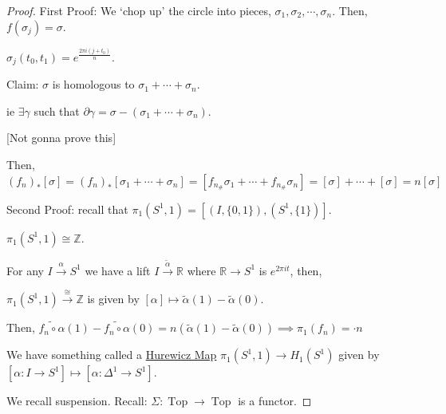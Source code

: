 \documentclass{article}
\theoremstyle{definition}
\begin{document}
    \begin{proof}
        First Proof: We `chop up' the circle into pieces, \(\sigma_1, \sigma_2, \cdots , \sigma_n\). Then, \(f(\sigma_j) = \sigma\). 
        
        \(\sigma_j(t_0,t_1) = e^{\frac{2\pi i(j+t_0)}{n}}\).

        Claim: \(\sigma\) is homologous to \(\sigma_1 + \cdots + \sigma_n\).
        
        ie \(\exists \gamma\) such that \(\partial \gamma = \sigma - (\sigma_1 + \cdots + \sigma_n)\).

        [Not gonna prove this]

        Then, \((f_n)_{\ast} [\sigma] = (f_n)_{\ast} [\sigma_1 + \cdots + \sigma_n] = [f_{n_\#} \sigma_1 + \cdots + f_{n_\#} \sigma_n] = [\sigma] + \cdots + [\sigma] = n[\sigma]\)

        Second Proof: recall that \(\pi_1(S^1,1) = [(I,\{ 0,1 \}), (S^1,\{ 1 \})]\).
        
        \(\pi_1(S^1,1) \cong \mathbb{Z}\).

        For any \(I \xrightarrow{\alpha} S^1\) we have a lift \(I \xrightarrow{\widetilde{\alpha}} \mathbb{R}\) where \(\mathbb{R} \to S^1\) is \(e^{2 \pi i t}\), then,
        
        \(\pi_1(S^1,1) \xrightarrow{\cong} \mathbb{Z}\) is given by \([\alpha] \mapsto \widetilde{\alpha}(1) - \widetilde{\alpha}(0)\).

        Then, \(\widetilde{f_n \circ \alpha}(1) - \widetilde{f_n \circ \alpha}(0) = n (\widetilde{\alpha}(1) - \widetilde{\alpha}(0)) \implies \pi_1(f_n) = \cdot n\)

        We have something called a \underline{Hurewicz Map} \(\pi_1(S^1,1) \to H_1 (S^1)\) given by \([\alpha: I \to S^1] \mapsto [\alpha: \Delta^1 \to S^1]\).
        
        \begin{center}
        \end{center}

 
    
        We recall suspension. Recall: \(\Sigma: \operatorname{Top} \to \operatorname{Top}\) is a functor.


\end{proof}
\end{document}
